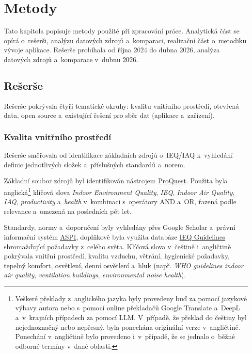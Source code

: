 \chapter{Metody}

Tato kapitola popisuje metody použité při zpracování práce. Analytická část se opírá o~rešerši, analýzu datových zdrojů a~komparaci, realizační část o~metodiku vývoje aplikace. Rešerše probíhala od října 2024 do dubna 2026, analýza datových zdrojů a~komparace v~dubnu 2026.

\section{Rešerše}

Rešerše pokrývala čtyři tematické okruhy: kvalitu vnitřního prostředí, otevřená data, open source a~existující řešení pro sběr dat (aplikace a~zařízení).

\FloatBarrier
\subsection{Kvalita vnitřního prostředí}

Rešerše směřovala od identifikace základních zdrojů o~IEQ/IAQ k~vyhledání definic jednotlivých složek a~příslušných standardů a~norem.

Základní soubor zdrojů byl identifikován nástrojem \href{https://www.proquest.com/}{ProQuest}. Použita byla anglická\footnote{Veškeré překlady z~anglického jazyka byly provedeny buď za pomocí jazykové výbavy autora nebo s~pomocí online překladačů Google Translate a~DeepL a~v~krajních případech za pomocí LLM. V~případě, že překlad do češtiny byl nejednoznačný nebo nepřesný, byla ponechána originální verze v~angličtině. Ponechání v~angličtině bylo provedeno i~v~případě, že se jednalo o~běžné odborné termíny v~dané oblasti.} klíčová slova \textit{Indoor Environment Quality}, \textit{IEQ}, \textit{Indoor Air Quality}, \textit{IAQ}, \textit{productivity} a~\textit{health} v~kombinaci s~operátory AND a~OR, řazená podle relevance a~omezená na posledních pět let.

Standardy, normy a~doporučení byly vyhledány přes Google Scholar a~právní informační systém \href{https://www.aspi.cz/menu/search}{ASPI}, doplňkově byla využita databáze \href{https://www.ieqguidelines.org/}{IEQ Guidelines} shromažďující požadavky z~celého světa. Klíčová slova v~češtině i~angličtině pokrývala vnitřní prostředí, kvalitu vzduchu, větrání, hygienické požadavky, tepelný komfort, osvětlení, denní osvětlení a~hluk (např. \textit{WHO guidelines indoor air quality}, \textit{ventilation buildings}, \textit{environmental noise health}).

